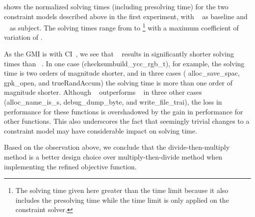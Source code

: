  shows the normalized solving times
(including \gls{presolving} time) for the two \glspl{constraint model} described
above in the first experiment, with ~ as \gls{baseline} and ~ as \gls{subject}.
%
The solving times range from
\printMinSolvingTime{
  \NewOpCostFunVsOldPrePlusSolvingTimeSpeedupPrePlusSolvingTimeAvgMin,
  \NewOpCostFunVsOldPrePlusSolvingTimeSpeedupBaselinePrePlusSolvingTimeAvgMin
} to
\printMaxSolvingTime{
  \NewOpCostFunVsOldPrePlusSolvingTimeSpeedupPrePlusSolvingTimeAvgMax,
  \NewOpCostFunVsOldPrePlusSolvingTimeSpeedupBaselinePrePlusSolvingTimeAvgMax
}%
%
\footnote{%
  The solving time given here greater than the time limit because it also
  includes the \gls{presolving} time while the time limit is only applied on the
  \gls{constraint solver}.%
}
%
with a maximum coefficient of variation of
\numMaxOf{
  \NewOpCostFunVsOldPrePlusSolvingTimeSpeedupPrePlusSolvingTimeCvMax,
  \NewOpCostFunVsOldPrePlusSolvingTimeSpeedupBaselinePrePlusSolvingTimeCvMax
}.

As the \gls{GMI} is \printGMI{%
  \NewOpCostFunVsOldPrePlusSolvingTimeSpeedupPrePlusSolvingTimeRegularSpeedupGmean%
} with \gls{CI}~\printGMICI{%
  \NewOpCostFunVsOldPrePlusSolvingTimeSpeedupPrePlusSolvingTimeRegularSpeedupCiMin%
}{%
  \NewOpCostFunVsOldPrePlusSolvingTimeSpeedupPrePlusSolvingTimeRegularSpeedupCiMax%
}, we see that ~ results in
significantly shorter solving times than ~.
%
In one case (checksum{\codeFont build\_ycc\_rgb\_t}), for example, the solving
time is two orders of magnitude shorter, and in three cases ({\codeFont
  alloc\_save\_spac}, {\codeFont gpk\_open}, and {\codeFont trueRandAccum}) the
solving time is more than one order of magnitude shorter.
%
Although ~ outperforms
~ in three other cases
({\codeFont alloc\_name\_is\_s}, {\codeFont debug\_dump\_byte}, and {\codeFont
  write\_file\_trai}), the loss in performance for these \glspl{function} is
overshadowed by the gain in performance for other \glspl{function}.
%
This also underscores the fact that seemingly trivial changes to a
\gls{constraint model} may have considerable impact on solving time.

Based on the observation above, we conclude that the \gls{divide-then-multiply
  method} is a better design choice over \gls{multiply-then-divide method} when
implementing the refined \gls{objective function}.


